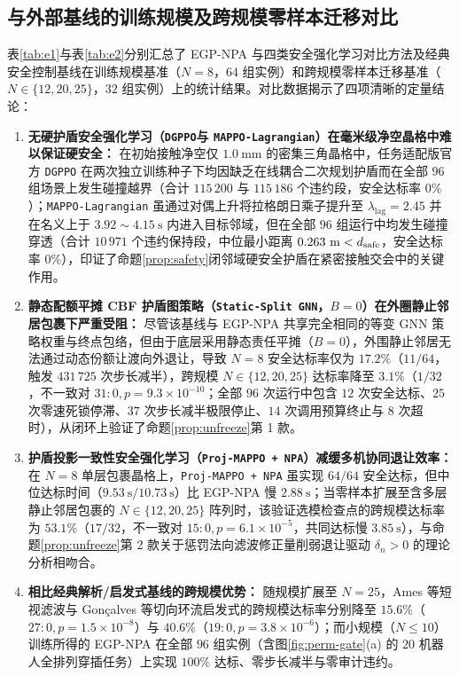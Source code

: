\subsection{与外部基线的训练规模及跨规模零样本迁移对比}
表\ref{tab:e1}与表\ref{tab:e2}分别汇总了 EGP-NPA 与四类安全强化学习对比方法及经典安全控制基线在训练规模基准（$N=8$，$64$ 组实例）和跨规模零样本迁移基准（$N\in\{12,20,25\}$，$32$ 组实例）上的统计结果。对比数据揭示了四项清晰的定量结论：
\begin{enumerate}
 \item \textbf{无硬护盾安全强化学习（\texttt{DGPPO}\cite{zhang2025dgppo}与 \texttt{MAPPO-Lagrangian}\cite{gu2023safe}）在毫米级净空晶格中难以保证硬安全：} 在初始接触净空仅 $1.0\ \mathrm{mm}$ 的密集三角晶格中，任务适配版官方 \texttt{DGPPO} 在两次独立训练种子下均因缺乏在线耦合二次规划护盾而在全部 $96$ 组场景上发生碰撞越界（合计 $115\,200$ 与 $115\,186$ 个违约段，安全达标率 $0\%$）；\texttt{MAPPO-Lagrangian} 虽通过对偶上升将拉格朗日乘子提升至 $\lambda_{\mathrm{lag}}=2.45$ 并在名义上于 $3.92\sim 4.15\ \mathrm s$ 内进入目标邻域，但在全部 $96$ 组运行中均发生碰撞穿透（合计 $10\,971$ 个违约保持段，中位最小距离 $0.263\ \mathrm m<d_{\mathrm{safe}}$，安全达标率 $0\%$），印证了命题\ref{prop:safety}闭邻域硬安全护盾在紧密接触交会中的关键作用。
 \item \textbf{静态配额平摊 CBF 护盾图策略（\texttt{Static-Split GNN}\cite{ames2017cbf,zhang2025gcbf}，$B=0$）在外圈静止邻居包裹下严重受阻：} 尽管该基线与 EGP-NPA 共享完全相同的等变 GNN 策略权重与终点包络，但由于底层采用静态责任平摊（$B=0$），外围静止邻居无法通过动态份额让渡向外退让，导致 $N=8$ 安全达标率仅为 $17.2\%$（$11/64$，触发 $431\,725$ 次步长减半），跨规模 $N\in\{12,20,25\}$ 达标率降至 $3.1\%$（$1/32$，不一致对 $31:0,p=9.3\times 10^{-10}$；全部 $96$ 次运行中包含 $12$ 次安全达标、$25$ 次零速死锁停滞、$37$ 次步长减半极限停止、$14$ 次调用预算终止与 $8$ 次超时），从闭环上验证了命题\ref{prop:unfreeze}第 1 款。
 \item \textbf{护盾投影一致性安全强化学习（\texttt{Proj-MAPPO + NPA}\cite{wabersich2021,liu2026saferl}）减缓多机协同退让效率：} 在 $N=8$ 单层包裹晶格上，\texttt{Proj-MAPPO + NPA} 虽实现 $64/64$ 安全达标，但中位达标时间（$9.53\ \mathrm s / 10.73\ \mathrm s$）比 EGP-NPA 慢 $2.88\ \mathrm s$；当零样本扩展至含多层静止邻居包裹的 $N\in\{12,20,25\}$ 阵列时，该验证选模检查点的跨规模达标率为 $53.1\%$（$17/32$，不一致对 $15:0,p=6.1\times 10^{-5}$，共同达标慢 $3.85\ \mathrm s$），与命题\ref{prop:unfreeze}第 2 款关于惩罚法向滤波修正量削弱退让驱动 $\delta_n>0$ 的理论分析相吻合。
 \item \textbf{相比经典解析/启发式基线的跨规模优势：} 随规模扩展至 $N=25$，Ames 等\cite{ames2017cbf,reis2021}短视滤波与 Gon\c{c}alves 等\cite{goncalves2023circulation}切向环流启发式的跨规模达标率分别降至 $15.6\%$（$27:0,p=1.5\times 10^{-8}$）与 $40.6\%$（$19:0,p=3.8\times 10^{-6}$）；而小规模（$N\le 10$）训练所得的 EGP-NPA 在全部 $96$ 组实例（含图\ref{fig:perm-gate}(a) 的 $20$ 机器人全排列穿插任务）上实现 $100\%$ 达标、零步长减半与零审计违约。
\end{enumerate}

